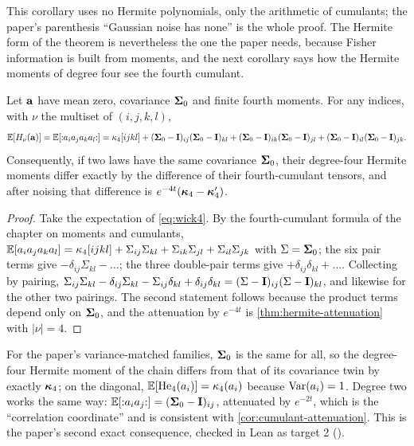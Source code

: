 This corollary uses no Hermite polynomials, only the arithmetic of cumulants; the
paper's parenthesis ``Gaussian noise has none'' is the whole proof. The Hermite form
of the theorem is nevertheless the one the paper needs, because Fisher information is
built from moments, and the next corollary says how the Hermite moments of degree
four see the fourth cumulant.

\begin{corollary}
\label{cor:degree-four}
Let $\mathbf{a}$ have mean zero, covariance $\mathbf{\Sigma}_0$ and finite fourth moments. For any
indices, with $\nu$ the multiset of $(i,j,k,l)$,
\begin{equation}
  \mathbb{E}[H_\nu(\mathbf{a})]=\mathbb{E}[{:}a_ia_ja_ka_l{:}]
  =\kappa_4[ijkl]+(\mathbf{\Sigma}_0-\mathbf{I})_{ij}(\mathbf{\Sigma}_0-\mathbf{I})_{kl}+(\mathbf{\Sigma}_0-\mathbf{I})_{ik}(\mathbf{\Sigma}_0-\mathbf{I})_{jl}+(\mathbf{\Sigma}_0-\mathbf{I})_{il}(\mathbf{\Sigma}_0-\mathbf{I})_{jk}.
  \label{eq:he4-kappa4}
\end{equation}
Consequently, if two laws have the same covariance $\mathbf{\Sigma}_0$, their degree-four
Hermite moments differ exactly by the difference of their fourth-cumulant tensors,
and after noising that difference is $e^{-4t}(\bm{\kappa}_4-\bm{\kappa}_4')$.
\end{corollary}
\begin{proof}
Take the expectation of \cref{eq:wick4}. By the fourth-cumulant formula of the chapter
on moments and cumulants, $\mathbb{E}[a_ia_ja_ka_l]=\kappa_4[ijkl]+\Sigma_{ij}\Sigma_{kl}+\Sigma_{ik}\Sigma_{jl}+\Sigma_{il}\Sigma_{jk}$
with $\Sigma=\mathbf{\Sigma}_0$; the six pair terms give $-\delta_{ij}\Sigma_{kl}-\dots$; the three
double-pair terms give $+\delta_{ij}\delta_{kl}+\dots$. Collecting by pairing,
$\Sigma_{ij}\Sigma_{kl}-\delta_{ij}\Sigma_{kl}-\Sigma_{ij}\delta_{kl}+\delta_{ij}\delta_{kl}=(\Sigma-\mathbf{I})_{ij}(\Sigma-\mathbf{I})_{kl}$,
and likewise for the other two pairings. The second statement follows because the
product terms depend only on $\mathbf{\Sigma}_0$, and the attenuation by $e^{-4t}$ is
\cref{thm:hermite-attenuation} with $|\nu|=4$.
\end{proof}

For the paper's variance-matched families, $\mathbf{\Sigma}_0$ is the same for all, so the
degree-four Hermite moment of the chain differs from that of its covariance twin by
exactly $\bm{\kappa}_4$; on the diagonal, $\mathbb{E}[\mathrm{He}_{4}(a_i)]=\kappa_4(a_i)$ because $\operatorname{Var}(a_i)=1$.
Degree two works the same way: $\mathbb{E}[{:}a_ia_j{:}]=(\mathbf{\Sigma}_0-\mathbf{I})_{ij}$, attenuated by $e^{-2t}$,
which is the ``correlation coordinate'' and is consistent with
\cref{cor:cumulant-attenuation}. This is the paper's second exact consequence, checked
in Lean as target 2 ().

